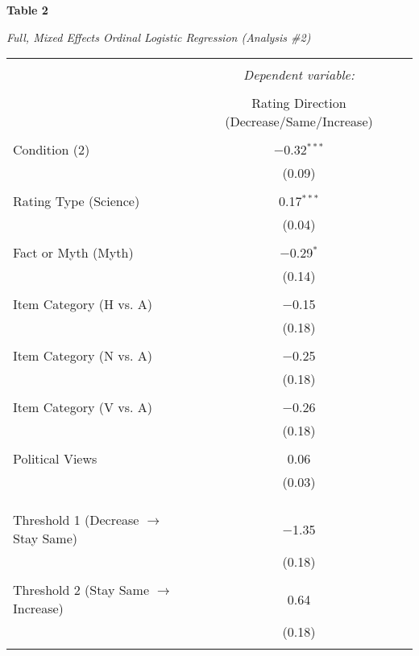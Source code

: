 \documentclass[12pt]{article}  %
\begin{document}
\textbf{Table 2}

\textit{Full, Mixed Effects Ordinal Logistic Regression (Analysis \#2)}

\vspace{0.5cm}

\begin{table}[!htbp] \centering 
\begin{tabular}{@{\extracolsep{5pt}}lc} 
\\[-1.8ex]\hline 
\hline \\[-1.8ex] 
 & \multicolumn{1}{c}{\textit{Dependent variable:}} \\ 
\cline{2-2} 
\\[-1.8ex] & Rating Direction (Decrease/Same/Increase) \\ 
\hline \\[-1.8ex] 
 Condition (2) & $-$0.32$^{***}$ \\ 
  & (0.09) \\ 
  & \\ 
 Rating Type (Science) & 0.17$^{***}$ \\ 
  & (0.04) \\ 
  & \\ 
 Fact or Myth (Myth) & $-$0.29$^{*}$ \\ 
  & (0.14) \\ 
  & \\ 
 Item Category (H vs. A) & $-$0.15 \\ 
  & (0.18) \\ 
  & \\ 
 Item Category (N vs. A) & $-$0.25 \\ 
  & (0.18) \\ 
  & \\ 
 Item Category (V vs. A) & $-$0.26 \\ 
  & (0.18) \\ 
  & \\ 
 Political Views & 0.06 \\ 
  & (0.03) \\ 
  & \\ 
 \hline \\[-1.8ex] 
  & \\
 Threshold 1 (Decrease $\rightarrow$ Stay Same) & $-$1.35 \\ 
  & (0.18) \\ 
  & \\ 
 Threshold 2 (Stay Same $\rightarrow$ Increase) & 0.64 \\ 
  & (0.18) \\ 

\hline 
\hline \\[-1.8ex]
\end{tabular} 
\end{table} 
\end{document}
